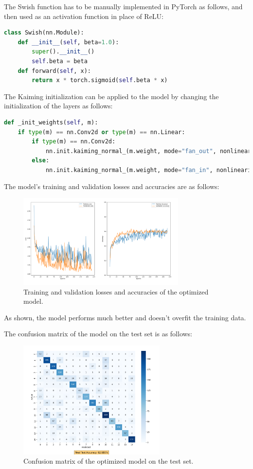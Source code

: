 \documentclass[a4paper, 11pt]{article}
\begin{document}
The Swish function has to be manually implemented in PyTorch as follows, and then used as an activation function in place of ReLU:
\begin{lstlisting}[language=Python]
class Swish(nn.Module):
    def __init__(self, beta=1.0):
        super().__init__()
        self.beta = beta
    def forward(self, x):
        return x * torch.sigmoid(self.beta * x)
\end{lstlisting}
The Kaiming initialization can be applied to the model by changing the initialization of the layers as follows:
\begin{lstlisting}[language=Python]
def _init_weights(self, m):
    if type(m) == nn.Conv2d or type(m) == nn.Linear:
        if type(m) == nn.Conv2d:
            nn.init.kaiming_normal_(m.weight, mode="fan_out", nonlinearity="relu")
        else:
            nn.init.kaiming_normal_(m.weight, mode="fan_in", nonlinearity="relu")
\end{lstlisting}
The model's training and validation losses and accuracies are as follows:
\begin{figure}[h]
    \centering
    \includegraphics[width=0.75\textwidth]{loss_and_accuracy_task_2.png}
    \caption{Training and validation losses and accuracies of the optimized model.}
    \label{fig:task2_loss_accuracy}
\end{figure}

As shown, the model performs much better and doesn't overfit the training data.

\pagebreak

The confusion matrix of the model on the test set is as follows:
\begin{figure}[h]
    \centering
    \includegraphics[width=0.66\textwidth]{confusion_matrix_task_2.png}
    \caption{Confusion matrix of the optimized model on the test set.}
    \label{fig:task2_confusion_matrix}
\end{figure}
\end{document}

